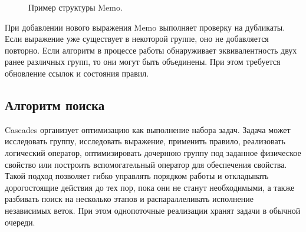 \documentclass[fontsize=14pt, russian]{scrartcl}
\begin{document}
\begin{figure}[H]
    \caption{Пример структуры Memo.}%
    \label{fig:memo-structure}
\end{figure}

При добавлении нового выражения Memo выполняет проверку на дубликаты. Если
выражение уже существует в некоторой группе, оно не добавляется повторно. Если
алгоритм в процессе работы обнаруживает эквивалентность двух ранее различных
групп, то они могут быть объединены. При этом требуется обновление ссылок и
состояния правил.

\subsection{Алгоритм поиска}

Cascades организует оптимизацию как выполнение набора задач. Задача может
исследовать группу, исследовать выражение, применить правило, реализовать
логический оператор, оптимизировать дочернюю группу под заданное физическое
свойство или построить вспомогательный оператор для обеспечения свойства. Такой
подход позволяет гибко управлять порядком работы и откладывать дорогостоящие
действия до тех пор, пока они не станут необходимыми, а также разбивать поиск на
несколько этапов и распараллеливать исполнение независимых веток. При этом
однопоточные реализации хранят задачи в обычной очереди.
\end{document}
